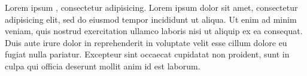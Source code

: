 \documentclass{article}
\begin{document}
Lorem ipsum , consectetur adipisicing. Lorem
ipsum dolor sit amet, consectetur adipisicing elit, sed do eiusmod
tempor incididunt ut  aliqua. Ut enim
ad minim veniam, quis nostrud exercitation ullamco laboris nisi ut
aliquip ex ea  consequat. Duis aute irure dolor in
reprehenderit in voluptate velit esse cillum dolore eu fugiat nulla
pariatur. Excepteur sint occaecat cupidatat non proident, sunt in culpa
qui officia deserunt mollit anim id est laborum.
\end{document}
